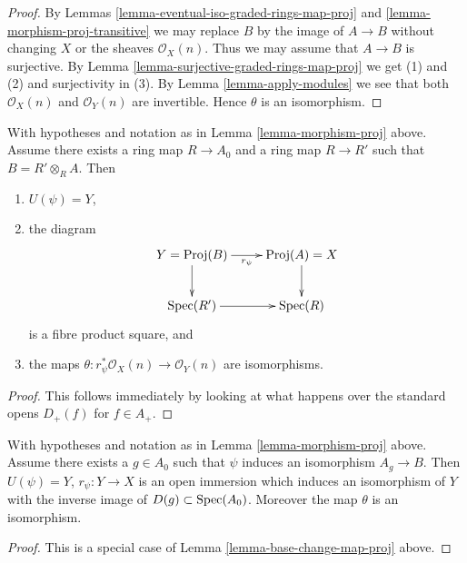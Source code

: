 \begin{proof}
By Lemmas \ref{lemma-eventual-iso-graded-rings-map-proj} and
\ref{lemma-morphism-proj-transitive}
we may replace $B$ by the image of $A \to B$
without changing $X$ or the sheaves $\mathcal{O}_X(n)$.
Thus we may assume that $A \to B$ is surjective. By
Lemma \ref{lemma-surjective-graded-rings-map-proj} we get (1) and (2)
and surjectivity in (3).
By Lemma \ref{lemma-apply-modules} we see that both
$\mathcal{O}_X(n)$ and $\mathcal{O}_Y(n)$
are invertible. Hence $\theta$ is an isomorphism.
\end{proof}

\begin{lemma}
\label{lemma-base-change-map-proj}
\begin{reference}
\cite[II, Proposition 2.8.10]{EGA}
\end{reference}
With hypotheses and notation as in Lemma \ref{lemma-morphism-proj} above.
Assume there exists a ring map $R \to A_0$ and a ring map
$R \to R'$ such that $B = R' \otimes_R A$. Then
\begin{enumerate}
\item $U(\psi) = Y$,
\item the diagram
$$
\xymatrix{
Y = \text{Proj}(B) \ar[r]_{r_\psi} \ar[d] &
\text{Proj}(A) = X \ar[d] \\
\Spec(R') \ar[r] &
\Spec(R)
}
$$
is a fibre product square, and
\item the maps $\theta : r_\psi^*\mathcal{O}_X(n) \to \mathcal{O}_Y(n)$
are isomorphisms.
\end{enumerate}
\end{lemma}

\begin{proof}
This follows immediately by looking at what happens over the standard
opens $D_{+}(f)$ for $f \in A_{+}$.
\end{proof}

\begin{lemma}
\label{lemma-localization-map-proj}
With hypotheses and notation as in Lemma \ref{lemma-morphism-proj} above.
Assume there exists a $g \in A_0$ such that $\psi$ induces an
isomorphism $A_g \to B$. Then
$U(\psi) = Y$, $r_\psi : Y \to X$ is an open immersion
which induces an isomorphism of $Y$ with the inverse image
of $D(g) \subset \mathop{\mathrm{Spec}}(A_0)$. Moreover the map $\theta$
is an isomorphism.
\end{lemma}

\begin{proof}
This is a special case of Lemma \ref{lemma-base-change-map-proj} above.
\end{proof}

